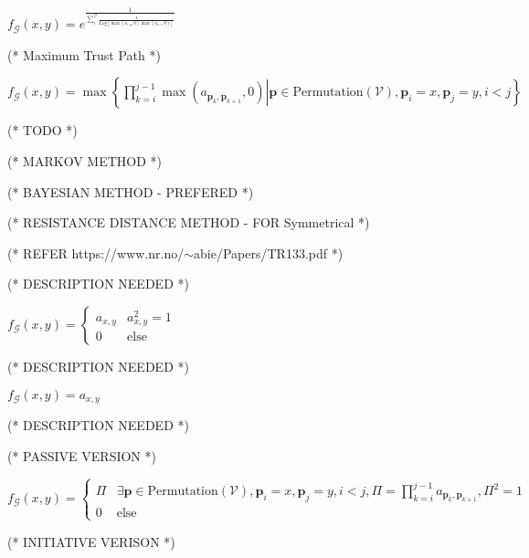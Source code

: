 \documentclass{article}
\begin{document}
\(f_{\mathcal{G}}(x,y)=e^{\frac{1}{\sum _i^{\mathcal{V}} \frac{1}{\text{Log}\left[\max \left(a_{i,y},0\right) \max \left(a_{x,i},0\right)\right]}}}\)



(* Maximum Trust Path *)

\(f_{\mathcal{G}}(x,y)=\max \left\{\left.\prod _{k=i}^{j-1} \max \left(a_{\pmb{p}_k,\pmb{p}_{k+1}},0\right)\right|\pmb{p}\in \text{Permutation}(\mathcal{V}),\pmb{p}_i=x,\pmb{p}_j=y,i<j\right\}\)



(* TODO *)



(* MARKOV METHOD *)



(* BAYESIAN METHOD - PREFERED *)



(* RESISTANCE DISTANCE METHOD - FOR Symmetrical *)



(* REFER https://www.nr.no/$\sim $abie/Papers/TR133.pdf *)





(* DESCRIPTION NEEDED *)

\(f_{\mathcal{G}}(x,y)=\begin{cases}
 a_{x,y} & a_{x,y}^2=1 \\
 0 & \text{else}
\end{cases}\)





(* DESCRIPTION NEEDED *)

\(f_{\mathcal{G}}(x,y)=a_{x,y}\)





(* DESCRIPTION NEEDED *)



(* PASSIVE VERSION *)

\(f_{\mathcal{G}}(x,y)=\begin{cases}
 \Pi  & \exists \pmb{p}\in \text{Permutation}(\mathcal{V}),\pmb{p}_i=x,\pmb{p}_j=y,i<j,\Pi =\prod _{k=i}^{j-1} a_{\pmb{p}_k,\pmb{p}_{k+1}},\Pi ^2=1
\\
 0 & \text{else}
\end{cases}\)



(* INITIATIVE VERISON *)
\end{document}
